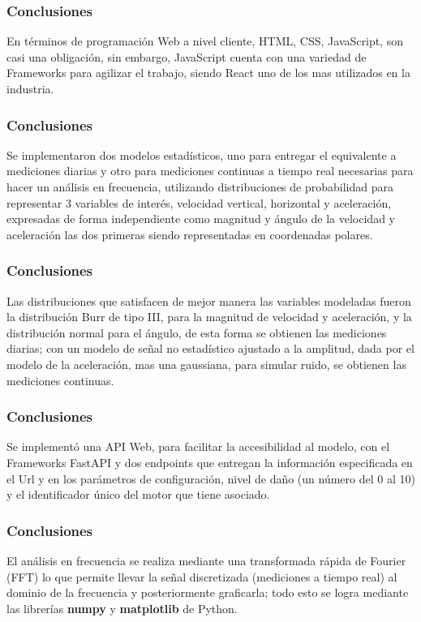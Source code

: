 \documentclass{beamer}
\begin{document}
\begin{frame}
    \frametitle{Conclusiones}
     En términos de programación Web a nivel cliente,
    HTML, CSS, JavaScript, son casi una obligación, sin embargo,
    JavaScript cuenta con una  variedad de Frameworks para agilizar el
    trabajo, siendo React uno
    de los mas utilizados en la industria.
\end{frame}


\begin{frame}
    \frametitle{Conclusiones}
     Se implementaron dos modelos estadísticos, uno para entregar el
    equivalente a mediciones diarias y otro para mediciones continuas a tiempo
    real necesarias para hacer un análisis en frecuencia,
    utilizando distribuciones de probabilidad para representar 3 variables de interés,
    velocidad vertical, horizontal y aceleración, expresadas de forma independiente
    como magnitud y ángulo de la velocidad y aceleración las dos primeras
    siendo representadas en coordenadas polares.
\end{frame}

\begin{frame}
    \frametitle{Conclusiones}
            Las distribuciones que satisfacen de mejor manera las variables
        modeladas fueron la distribución Burr
        de tipo III, para la magnitud de velocidad y aceleración, y la distribución
        normal para el ángulo, de esta forma se obtienen las mediciones diarias;
        con un modelo de señal no estadístico ajustado a la amplitud, dada por
        el modelo de la aceleración, mas una gaussiana, para simular ruido, se obtienen
        las mediciones continuas.
\end{frame}


\begin{frame}
    \frametitle{Conclusiones}
        Se implementó una API Web, para facilitar la accesibilidad al modelo, con
        el Frameworks FastAPI y dos endpoints que entregan la información especificada
        en el Url y en los parámetros de configuración, nivel de daño (un número del 0 al 10)
        y el identificador único del motor que tiene asociado.
\end{frame}

\begin{frame}
    \frametitle{Conclusiones}
    El análisis en frecuencia se realiza mediante una
        transformada rápida de Fourier (FFT) lo que permite llevar la señal
        discretizada (mediciones a tiempo real) al dominio de la frecuencia
        y posteriormente graficarla; todo esto se logra mediante las librerías
        \textbf{numpy} y \textbf{matplotlib} de Python.
\end{frame}
\end{document}
